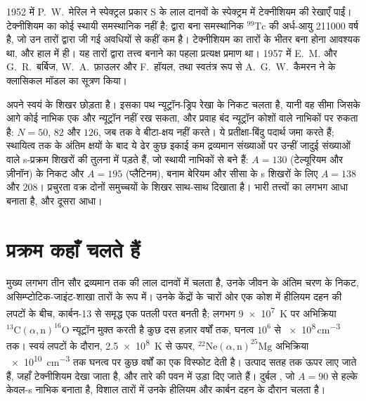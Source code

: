 \begin{history}[लाल दानवों में टेक्नीशियम]
1952 में P.~W.~मेरिल ने स्पेक्ट्रल प्रकार S के लाल दानवों के स्पेक्ट्रम में
टेक्नीशियम की रेखाएँ पाईं। टेक्नीशियम का कोई स्थायी समस्थानिक नहीं है;  द्वारा बना
समस्थानिक $^{99}\mathrm{Tc}$ की अर्ध-आयु
\num{211000} वर्ष है, जो उन तारों द्वारा जी गई अवधियों से
कहीं कम है। टेक्नीशियम का तारों के भीतर बना होना आवश्यक था, और
हाल में ही। यह तारों द्वारा तत्त्व बनाने का पहला प्रत्यक्ष प्रमाण था।
1957 में E.~M. और G.~R.~बर्बिज, W.~A.~फ़ाउलर और F.~हॉयल, तथा
स्वतंत्र रूप से A.~G.~W.~कैमरन ने  के क्लासिकल
मॉडल का सूत्रण किया।
\end{history}

 अपने स्वयं के शिखर छोड़ता है। इसका पथ न्यूट्रॉन-ड्रिप रेखा के
निकट चलता है, यानी वह सीमा जिसके आगे कोई नाभिक एक और न्यूट्रॉन नहीं रख सकता,
और प्रवाह बंद न्यूट्रॉन कोशों वाले नाभिकों पर रुकता है: $N = 50$, $82$ और
$126$, जब तक वे बीटा-क्षय नहीं करते। ये प्रतीक्षा-बिंदु पदार्थ जमा करते हैं;
स्थायित्व तक के अंतिम क्षयों के बाद ये ढेर कुछ इकाई कम द्रव्यमान संख्याओं पर
उन्हीं जादुई संख्याओं वाले s-प्रक्रम शिखरों की तुलना में पड़ते हैं, जो स्थायी नाभिकों से बने हैं:
$A = 130$ (टेल्यूरियम और ज़ीनॉन) के निकट और $A = 195$ (प्लैटिनम),
बनाम बेरियम और सीसा के s शिखरों के लिए $A = 138$ और $208$।
प्रचुरता वक्र दोनों समुच्चयों के शिखर
साथ-साथ दिखाता है।  भारी तत्त्वों का लगभग आधा
बनाता है, और  दूसरा आधा।

\section{प्रक्रम कहाँ चलते हैं}\label{sec:b3:origin-of-elements:sites}

मुख्य  लगभग तीन सौर द्रव्यमान तक की लाल दानवों में चलता है, उनके जीवन के
अंतिम चरण के निकट, असिम्प्टोटिक-जाइंट-शाखा तारों के रूप में। उनके केंद्रों के चारों
ओर एक कोश में हीलियम दहन की लपटों के बीच, कार्बन-13 से समृद्ध एक पतली परत
बनती है; लगभग \qty{9e7}{K} पर अभिक्रिया
$^{13}\mathrm{C}(\alpha,\mathrm{n})^{16}\mathrm{O}$ न्यूट्रॉन मुक्त करती है
कुछ दस हज़ार वर्षों तक, घनत्व $10^6$ से
\num{e8}\,\unit{cm^{-3}} तक। स्वयं लपटों के दौरान, \qty{2.5e8}{K} से
ऊपर, $^{22}\mathrm{Ne}(\alpha,\mathrm{n})^{25}\mathrm{Mg}$ अभिक्रिया
\qty{e10}{cm^{-3}} तक घनत्व पर कुछ वर्षों का एक विस्फोट देती है। उत्पाद
सतह तक ऊपर लाए जाते हैं, जहाँ टेक्नीशियम देखा जाता है, और तारे की
पवन में उड़ा दिए जाते हैं। दुर्बल , जो $A = 90$ से हल्के केवल-s नाभिक बनाता है,
विशाल तारों में उनके हीलियम और
कार्बन दहन के दौरान चलता है।

